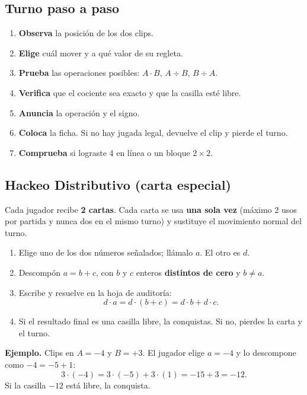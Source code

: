 \documentclass[12pt, letterpaper]{article}
\begin{document}
\subsection{Turno paso a paso}

\begin{enumerate}[leftmargin=*]
  \item \textbf{Observa} la posición de los dos clips.
  \item \textbf{Elige} cuál mover y a qué valor de su regleta.
  \item \textbf{Prueba} las operaciones posibles: $A\cdot B$, $A\div B$, $B\div A$.
  \item \textbf{Verifica} que el cociente sea exacto y que la casilla esté libre.
  \item \textbf{Anuncia} la operación y el signo.
  \item \textbf{Coloca} la ficha. Si no hay jugada legal, devuelve el clip y pierde el turno.
  \item \textbf{Comprueba} si lograste 4 en línea o un bloque $2\times 2$.
\end{enumerate}

\subsection{Hackeo Distributivo (carta especial)}

Cada jugador recibe \textbf{2 cartas}. Cada carta se usa \textbf{una sola vez} (máximo 2 usos por partida y nunca dos en el mismo turno) y sustituye el movimiento normal del turno.

\begin{cuadropasos}
\begin{enumerate}[leftmargin=*]
  \item Elige uno de los dos números señalados; llámalo $a$. El otro es $d$.
  \item Descompón $a=b+c$, con $b$ y $c$ enteros \textbf{distintos de cero} y $b\ne a$.
  \item Escribe y resuelve en la hoja de auditoría:
  \[
    d\cdot a=d\cdot(b+c)=d\cdot b+d\cdot c.
  \]
  \item Si el resultado final es una casilla libre, la conquistas. Si no, pierdes la carta y el turno.
\end{enumerate}
\end{cuadropasos}

\textbf{Ejemplo.} Clips en $A=-4$ y $B=+3$. El jugador elige $a=-4$ y lo descompone como $-4=-5+1$:
\[
3\cdot(-4)=3\cdot(-5)+3\cdot(1)=-15+3=-12.
\]
Si la casilla $-12$ está libre, la conquista.
\end{document}
